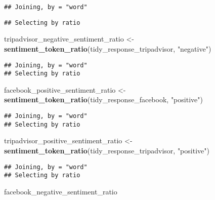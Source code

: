 \documentclass[]{article}
\newenvironment{Shaded}{\begin{snugshade}}{\end{snugshade}}
\newcommand{\KeywordTok}[1]{\textcolor[rgb]{0.13,0.29,0.53}{\textbf{#1}}}
\newcommand{\StringTok}[1]{\textcolor[rgb]{0.31,0.60,0.02}{#1}}
\newcommand{\NormalTok}[1]{#1}
\begin{document}
\begin{verbatim}
## Joining, by = "word"
\end{verbatim}

\begin{verbatim}
## Selecting by ratio
\end{verbatim}

\begin{Shaded}
\begin{Highlighting}[]
\NormalTok{tripadvisor_negative_sentiment_ratio <-}\StringTok{ }
\StringTok{  }\KeywordTok{sentiment_token_ratio}\NormalTok{(tidy_response_tripadvisor, }\StringTok{"negative"}\NormalTok{)}
\end{Highlighting}
\end{Shaded}

\begin{verbatim}
## Joining, by = "word"
## Selecting by ratio
\end{verbatim}

\begin{Shaded}
\begin{Highlighting}[]
\NormalTok{facebook_positive_sentiment_ratio <-}\StringTok{ }
\StringTok{  }\KeywordTok{sentiment_token_ratio}\NormalTok{(tidy_response_facebook, }\StringTok{"positive"}\NormalTok{)}
\end{Highlighting}
\end{Shaded}

\begin{verbatim}
## Joining, by = "word"
## Selecting by ratio
\end{verbatim}

\begin{Shaded}
\begin{Highlighting}[]
\NormalTok{tripadvisor_positive_sentiment_ratio <-}\StringTok{ }
\StringTok{  }\KeywordTok{sentiment_token_ratio}\NormalTok{(tidy_response_tripadvisor, }\StringTok{"positive"}\NormalTok{)}
\end{Highlighting}
\end{Shaded}

\begin{verbatim}
## Joining, by = "word"
## Selecting by ratio
\end{verbatim}

\begin{Shaded}
\begin{Highlighting}[]
\NormalTok{facebook_negative_sentiment_ratio}
\end{Highlighting}
\end{Shaded}
\end{document}
